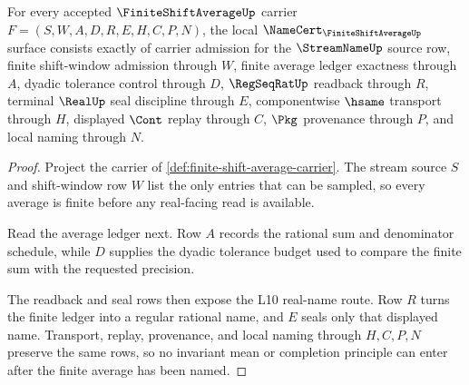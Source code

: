 \begin{theorem}
\label{thm:finite-shift-average-namecert-obligations}
For every accepted $\FiniteShiftAverageUp$ carrier $F=(S,W,A,D,R,E,H,C,P,N)$, the local $\NameCert_{\FiniteShiftAverageUp}$ surface consists exactly of carrier admission for the $\StreamNameUp$ source row, finite shift-window admission through $W$, finite average ledger exactness through $A$, dyadic tolerance control through $D$, $\RegSeqRatUp$ readback through $R$, terminal $\RealUp$ seal discipline through $E$, componentwise $\hsame$ transport through $H$, displayed $\Cont$ replay through $C$, $\Pkg$ provenance through $P$, and local naming through $N$.
\end{theorem}
\begin{proof}
Project the carrier of \autoref{def:finite-shift-average-carrier}. The stream source $S$ and shift-window row $W$ list the only entries that can be sampled, so every average is finite before any real-facing read is available.

Read the average ledger next. Row $A$ records the rational sum and denominator schedule, while $D$ supplies the dyadic tolerance budget used to compare the finite sum with the requested precision.

The readback and seal rows then expose the L10 real-name route. Row $R$ turns the finite ledger into a regular rational name, and $E$ seals only that displayed name. Transport, replay, provenance, and local naming through $H,C,P,N$ preserve the same rows, so no invariant mean or completion principle can enter after the finite average has been named.
\end{proof}

